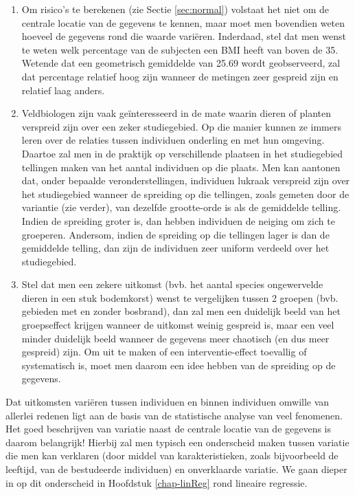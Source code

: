 \documentclass[
  12pt,dutch,coursenotes]{book}
\providecommand{\tightlist}{%
  \setlength{\itemsep}{0pt}\setlength{\parskip}{0pt}}
\begin{document}
\begin{enumerate}
\def\labelenumi{\arabic{enumi}.}
\tightlist
\item
  Om risico's te berekenen (zie Sectie \ref{sec:normal}) volstaat het niet om de centrale locatie van de gegevens te kennen, maar moet men bovendien weten hoeveel de gegevens rond die waarde variëren. Inderdaad, stel dat men wenst te weten welk percentage van de subjecten een BMI heeft van boven de 35. Wetende dat een geometrisch gemiddelde van 25.69 wordt geobserveerd, zal dat percentage relatief hoog zijn wanneer de metingen zeer gespreid zijn en relatief laag anders.
\item
  Veldbiologen zijn vaak geïnteresseerd in de mate waarin dieren of planten verspreid zijn over een zeker studiegebied. Op die manier kunnen ze immers leren over de relaties tussen individuen onderling en met hun omgeving. Daartoe zal men in de praktijk op verschillende plaatsen in het studiegebied tellingen maken van het aantal individuen op die plaats. Men kan aantonen dat, onder bepaalde veronderstellingen, individuen lukraak verspreid zijn over het studiegebied wanneer de spreiding op die tellingen, zoals gemeten door de variantie (zie verder), van dezelfde grootte-orde is als de gemiddelde telling. Indien de spreiding groter is, dan hebben individuen de neiging om zich te groeperen. Andersom, indien de spreiding op die tellingen lager is dan de gemiddelde telling, dan zijn de individuen zeer uniform verdeeld over het studiegebied.
\item
  Stel dat men een zekere uitkomst (bvb. het aantal species ongewervelde dieren in een stuk bodemkorst) wenst te vergelijken tussen 2 groepen (bvb. gebieden met en zonder bosbrand), dan zal men een duidelijk beeld van het groepseffect krijgen wanneer de uitkomst weinig gespreid is, maar een veel minder duidelijk beeld wanneer de gegevens meer chaotisch (en dus meer gespreid) zijn. Om uit te maken of een interventie-effect toevallig of systematisch is, moet men daarom een idee hebben van de spreiding op de gegevens.
\end{enumerate}

Dat uitkomsten variëren tussen individuen en binnen individuen omwille van
allerlei redenen ligt aan de basis van de statistische analyse van veel
fenomenen. Het goed beschrijven van variatie naast de centrale locatie van
de gegevens is daarom belangrijk! Hierbij zal men typisch een
onderscheid maken tussen variatie die men kan verklaren (door middel van
karakteristieken, zoals bijvoorbeeld de leeftijd, van de bestudeerde individuen) en onverklaarde variatie. We gaan
dieper in op dit onderscheid in Hoofdstuk \ref{chap-linReg} rond lineaire regressie.
\end{document}
